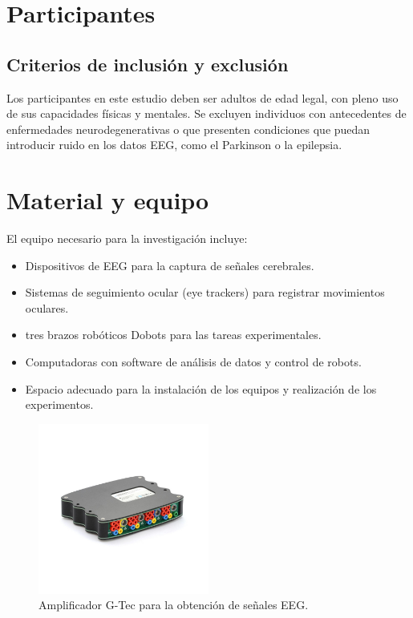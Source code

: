 \documentclass[12pt]{article}
\begin{document}
\section{Participantes}

\subsection{Criterios de inclusión y exclusión}
Los participantes en este estudio deben ser adultos de edad legal, con pleno uso de sus capacidades físicas y mentales. Se excluyen individuos con antecedentes de enfermedades neurodegenerativas o que presenten condiciones que puedan introducir ruido en los datos EEG, como el Parkinson o la epilepsia.

\section{Material y equipo}
El equipo necesario para la investigación incluye:

\begin{itemize}
    \item Dispositivos de EEG para la captura de señales cerebrales.
    \item Sistemas de seguimiento ocular (eye trackers) para registrar movimientos oculares.
    \item tres brazos robóticos Dobots para las tareas experimentales.
    \item Computadoras con software de análisis de datos y control de robots.
    \item Espacio adecuado para la instalación de los equipos y realización de los experimentos.
\end{itemize}

\begin{figure}[H]
    \centering
    \includegraphics[width=0.5\textwidth]{recursos_img/g_tec_amplifier.jpg}
    \caption{Amplificador G-Tec para la obtención de señales EEG.}
    \label{fig:amplifier}
\end{figure}
\end{document}

